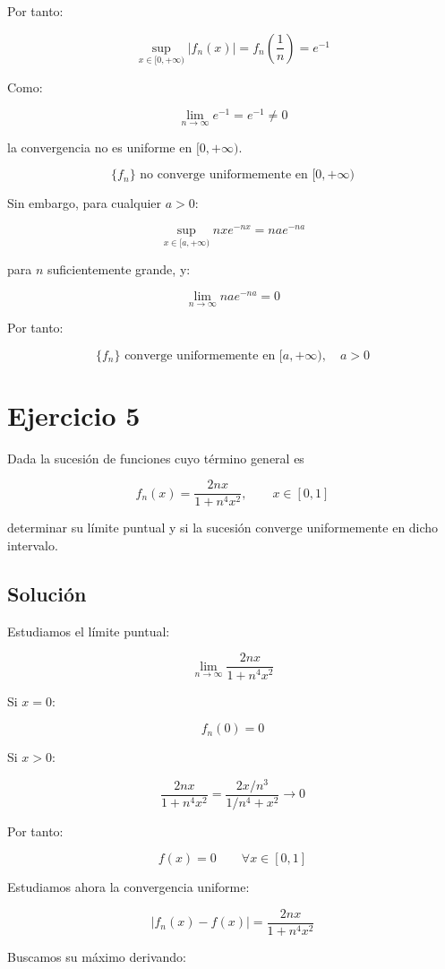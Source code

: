 \documentclass[fleqn]{article}
\begin{document}
	Por tanto:

	\[
	\sup_{x\in[0,+\infty)}
	|f_n(x)|
	=
	f_n\left(\frac{1}{n}\right)
	=
	e^{-1}
	\]

	Como:

	\[
	\lim_{n\to\infty}e^{-1}
	=
	e^{-1}\neq0
	\]

	la convergencia no es uniforme en $[0,+\infty)$.

	\[
	\boxed{
	\{f_n\}\text{ no converge uniformemente en }[0,+\infty)
	}
	\]

	Sin embargo, para cualquier $a>0$:

	\[
	\sup_{x\in[a,+\infty)}
	nxe^{-nx}
	=
	nae^{-na}
	\]

	para $n$ suficientemente grande, y:

	\[
	\lim_{n\to\infty}nae^{-na}=0
	\]

	Por tanto:

	\[
	\boxed{
	\{f_n\}\text{ converge uniformemente en }[a,+\infty),
	\quad a>0
	}
	\]

\section{Ejercicio 5}
	Dada la sucesión de funciones cuyo término general es

	\[
	f_n(x)=\frac{2nx}{1+n^4x^2},
	\qquad x\in[0,1]
	\]

	determinar su límite puntual y si la sucesión converge uniformemente en dicho intervalo.

	\subsection{Solución}

	Estudiamos el límite puntual:

	\[
	\lim_{n\to\infty}
	\frac{2nx}{1+n^4x^2}
	\]

	Si $x=0$:

	\[
	f_n(0)=0
	\]

	Si $x>0$:

	\[
	\frac{2nx}{1+n^4x^2}
	=
	\frac{2x/n^3}{1/n^4+x^2}
	\longrightarrow 0
	\]

	Por tanto:

	\[
	\boxed{
	f(x)=0
	\qquad \forall x\in[0,1]
	}
	\]

	Estudiamos ahora la convergencia uniforme:

	\[
	|f_n(x)-f(x)|
	=
	\frac{2nx}{1+n^4x^2}
	\]

	Buscamos su máximo derivando:
\end{document}
